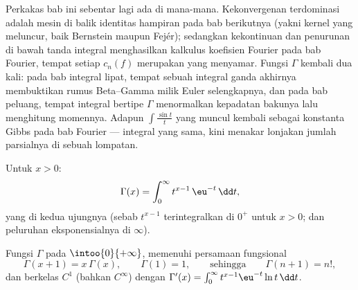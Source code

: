 \begin{remark}
Perkakas bab ini sebentar lagi ada di mana-mana. Kekonvergenan
terdominasi adalah mesin di balik identitas hampiran pada
bab berikutnya (yakni kernel yang meluncur, baik Bernstein maupun Fejér);
sedangkan kekontinuan dan penurunan di bawah tanda integral
menghasilkan kalkulus koefisien Fourier pada bab Fourier, tempat setiap
$c_n(f)$ merupakan  yang menyamar. Fungsi $\Gamma$
kembali dua kali: pada bab integral lipat, tempat
sebuah integral ganda akhirnya membuktikan rumus Beta--Gamma milik Euler
selengkapnya, dan pada bab peluang, tempat integral bertipe $\Gamma$
menormalkan kepadatan bakunya lalu menghitung momennya. Adapun
$\int\frac{\sin t}{t}$ yang  muncul kembali sebagai
konstanta Gibbs pada bab Fourier --- integral yang sama, kini menakar
lonjakan jumlah parsialnya di sebuah lompatan.
\end{remark}

\begin{definition}\label{def:b2:integration:gamma}
Untuk $x > 0$:
\[
\Gamma(x) = \int_0^{\infty} t^{x-1}\,\eu^{-t}\,\dd t ,
\]
yang  di kedua ujungnya (sebab $t^{x-1}$ terintegralkan di
$0^+$ untuk $x > 0$; dan peluruhan eksponensialnya di $\infty$).
\end{definition}

\begin{theorem}\label{thm:b2:integration:gammaprops}
Fungsi $\Gamma$  pada $\intoo{0}{+\infty}$, memenuhi persamaan
fungsional
\[
\Gamma(x + 1) = x\,\Gamma(x),
\qquad \Gamma(1) = 1,
\qquad\text{sehingga}\qquad \Gamma(n + 1) = n! ,
\]
dan berkelas $C^1$ (bahkan $C^\infty$) dengan $\Gamma'(x) =
\int_0^\infty t^{x-1}\eu^{-t}\ln t\,\dd t$.
\end{theorem}

